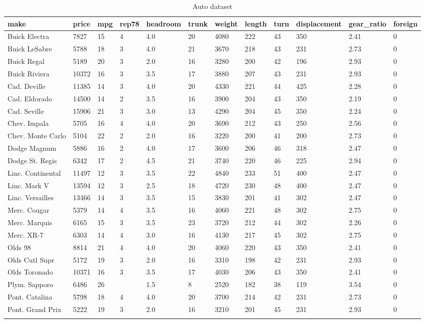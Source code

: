 \documentclass{article}
\begin{document}
\begin{table}[tbp] \centering
{}

\caption{Auto dataset}
{\scriptsize
\begin{tabularx}{\linewidth}{@{}lCCCCCCCCCCC@{}}

\toprule
{make}&{price}&{mpg}&{rep78}&{headroom}&{trunk}&{weight}&{length}&{turn}&{displacement}&{gear\_ratio}&{foreign} \tabularnewline
\midrule \addlinespace[\belowrulesep]
Buick Electra&7827&15&4&4.0&20&4080&222&43&350&2.41&0 \tabularnewline \addlinespace[0.1cm]
Buick LeSabre&5788&18&3&4.0&21&3670&218&43&231&2.73&0 \tabularnewline \addlinespace[0.1cm]
Buick Regal&5189&20&3&2.0&16&3280&200&42&196&2.93&0 \tabularnewline \addlinespace[0.1cm]
Buick Riviera&10372&16&3&3.5&17&3880&207&43&231&2.93&0 \tabularnewline \addlinespace[0.1cm]
Cad. Deville&11385&14&3&4.0&20&4330&221&44&425&2.28&0 \tabularnewline \addlinespace[0.1cm]
Cad. Eldorado&14500&14&2&3.5&16&3900&204&43&350&2.19&0 \tabularnewline \addlinespace[0.1cm]
Cad. Seville&15906&21&3&3.0&13&4290&204&45&350&2.24&0 \tabularnewline \addlinespace[0.1cm]
Chev. Impala&5705&16&4&4.0&20&3690&212&43&250&2.56&0 \tabularnewline \addlinespace[0.1cm]
Chev. Monte Carlo&5104&22&2&2.0&16&3220&200&41&200&2.73&0 \tabularnewline \addlinespace[0.1cm]
Dodge Magnum&5886&16&2&4.0&17&3600&206&46&318&2.47&0 \tabularnewline \addlinespace[0.1cm]
Dodge St. Regis&6342&17&2&4.5&21&3740&220&46&225&2.94&0 \tabularnewline \addlinespace[0.1cm]
Linc. Continental&11497&12&3&3.5&22&4840&233&51&400&2.47&0 \tabularnewline \addlinespace[0.1cm]
Linc. Mark V&13594&12&3&2.5&18&4720&230&48&400&2.47&0 \tabularnewline \addlinespace[0.1cm]
Linc. Versailles&13466&14&3&3.5&15&3830&201&41&302&2.47&0 \tabularnewline \addlinespace[0.1cm]
Merc. Cougar&5379&14&4&3.5&16&4060&221&48&302&2.75&0 \tabularnewline \addlinespace[0.1cm]
Merc. Marquis&6165&15&3&3.5&23&3720&212&44&302&2.26&0 \tabularnewline \addlinespace[0.1cm]
Merc. XR-7&6303&14&4&3.0&16&4130&217&45&302&2.75&0 \tabularnewline \addlinespace[0.1cm]
Olds 98&8814&21&4&4.0&20&4060&220&43&350&2.41&0 \tabularnewline \addlinespace[0.1cm]
Olds Cutl Supr&5172&19&3&2.0&16&3310&198&42&231&2.93&0 \tabularnewline \addlinespace[0.1cm]
Olds Toronado&10371&16&3&3.5&17&4030&206&43&350&2.41&0 \tabularnewline \addlinespace[0.1cm]
Plym. Sapporo&6486&26&&1.5&8&2520&182&38&119&3.54&0 \tabularnewline \addlinespace[0.1cm]
Pont. Catalina&5798&18&4&4.0&20&3700&214&42&231&2.73&0 \tabularnewline \addlinespace[0.1cm]
Pont. Grand Prix&5222&19&3&2.0&16&3210&201&45&231&2.93&0 \tabularnewline \addlinespace[0.1cm]

\end{tabularx}}
\end{table}
\end{document}
